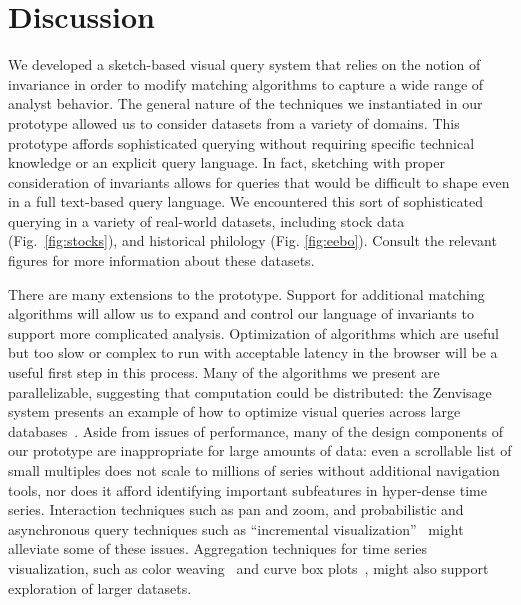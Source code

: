 \section{Discussion}

We developed a sketch-based visual query system that relies on the notion of invariance in order to modify matching algorithms to capture a wide range of analyst behavior. The general nature of the techniques we instantiated in our prototype allowed us to consider datasets from a variety of domains. This prototype affords sophisticated querying without requiring specific technical knowledge or an explicit query language. In fact, sketching with proper consideration of invariants allows for queries that would be difficult to shape even in a full text-based query language. We encountered this sort of sophisticated querying in a variety of real-world datasets, including stock data (Fig.~\ref{fig:stocks}), and historical philology (Fig. \ref{fig:eebo}). Consult the relevant figures for more information about these datasets.


There are many extensions to the prototype. Support for additional matching algorithms will allow us to expand and control our language of invariants to support more complicated analysis. Optimization of algorithms which are useful but too slow or complex to run with acceptable latency in the browser will be a useful first step in this process. Many of the algorithms we present are parallelizable, suggesting that computation could be distributed: the Zenvisage system presents an example of how to optimize visual queries across large databases~\cite{siddiquizenvisage}. Aside from issues of performance, many of the design components of our prototype are inappropriate for large amounts of data: even a scrollable list of small multiples does not scale to millions of series without additional navigation tools, nor does it afford identifying important subfeatures in hyper-dense time series. Interaction techniques such as pan and zoom, and probabilistic and asynchronous query techniques such as ``incremental visualization''~\cite{fisher2012trust} might alleviate some of these issues. Aggregation techniques for time series visualization, such as color weaving~\cite{albers2014task} and curve box plots~\cite{mirzargar2014curve}, might also support exploration of larger datasets. 

